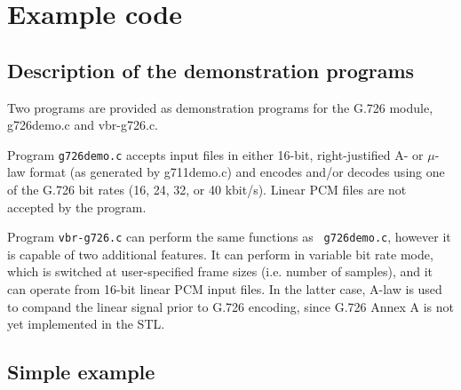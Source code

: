 \section{Example code}

\subsection {Description of the demonstration programs}

Two programs are provided as demonstration programs for the G.726 module,
g726demo.c and vbr-g726.c.

Program {\tt g726demo.c} accepts input files in either 16-bit,
right-justified A- or $\mu$-law format (as generated by g711demo.c)
and encodes and/or decodes using one of the G.726 bit rates (16, 24,
32, or 40 kbit/s). Linear PCM files are not accepted by the program.

Program {\tt vbr-g726.c} can perform the same functions as {\tt
g726demo.c}, however it is capable of two additional features. It can
perform in variable bit rate mode, which is switched at user-specified
frame sizes (i.e. number of samples), and it can operate from 16-bit
linear PCM input files. In the latter case, A-law is used to compand
the linear signal prior to G.726 encoding, since G.726 Annex A
\cite{G.726:LinearIO} is not yet implemented in the STL.

\subsection {Simple example}


